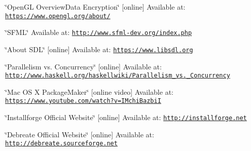 
\begin{DoxyEnumerate}
\item \label{_reference_r1}%
\hypertarget{_reference_r1}{}%
\char`\"{}\+Open\+G\+L Overview\+Data Encryption\char`\"{} \mbox{[}online\mbox{]} Available at\+: \href{https://www.opengl.org/about/}{\tt https\+://www.\+opengl.\+org/about/}
\item \label{_reference_r2}%
\hypertarget{_reference_r2}{}%
\char`\"{}\+S\+F\+M\+L\char`\"{} Available at\+: \href{http://www.sfml-dev.org/index.php}{\tt http\+://www.\+sfml-\/dev.\+org/index.\+php}
\item \label{_reference_r3}%
\hypertarget{_reference_r3}{}%
\char`\"{}\+About S\+D\+L\char`\"{} \mbox{[}online\mbox{]} Available at\+: \href{https://www.libsdl.org}{\tt https\+://www.\+libsdl.\+org}
\item \label{_reference_r4}%
\hypertarget{_reference_r4}{}%
\char`\"{}\+Parallelism vs. Concurrency\char`\"{} \mbox{[}online\mbox{]} Available at\+: \href{http://www.haskell.org/haskellwiki/Parallelism_vs._Concurrency}{\tt http\+://www.\+haskell.\+org/haskellwiki/\+Parallelism\+\_\+vs.\+\_\+\+Concurrency}
\item \label{_reference_r5}%
\hypertarget{_reference_r5}{}%
\char`\"{}\+Mac O\+S X Package\+Maker\char`\"{} \mbox{[}online video\mbox{]} Available at\+: \href{https://www.youtube.com/watch?v=IMchiBazbiI}{\tt https\+://www.\+youtube.\+com/watch?v=\+I\+Mchi\+Bazbi\+I}
\item \label{_reference_r6}%
\hypertarget{_reference_r6}{}%
\char`\"{}\+Installforge Official Website\char`\"{} \mbox{[}online\mbox{]} Available at\+: \href{http://installforge.net}{\tt http\+://installforge.\+net}
\item \label{_reference_r7}%
\hypertarget{_reference_r7}{}%
\char`\"{}\+Debreate Official Website\char`\"{} \mbox{[}online\mbox{]} Available at\+: \href{http://debreate.sourceforge.net}{\tt http\+://debreate.\+sourceforge.\+net} 
\end{DoxyEnumerate}